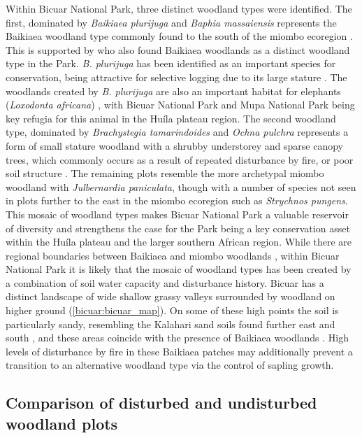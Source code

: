 \begin{refsection}
Within Bicuar National Park, three distinct woodland types were identified. The first, dominated by \textit{Baikiaea plurijuga} and \textit{Baphia massaiensis} represents the Baikiaea woodland type commonly found to the south of the miombo ecoregion \citep{Timberlake2010}. This is supported by \citet{Chisingui2018} who also found Baikiaea woodlands as a distinct woodland type in the Park. \textit{B. plurijuga} has been identified as an important species for conservation, being attractive for selective logging due to its large stature \citep{Ngandwe2017, Wallenfang2015}. The woodlands created by \textit{B. plurijuga} are also an important habitat for elephants (\textit{Loxodonta africana}) \citep{Sianga2017, Mukwashi2012}, with Bicuar National Park and Mupa National Park being key refugia for this animal in the Hu\'{i}la plateau region. The second woodland type, dominated by \textit{Brachystegia tamarindoides} and \textit{Ochna pulchra} represents a form of small stature woodland with a shrubby understorey and sparse canopy trees, which commonly occurs as a result of repeated disturbance by fire, or poor soil structure \citep{Smith2004}. The remaining plots resemble the more archetypal miombo woodland with \textit{Julbernardia paniculata}, though with a number of species not seen in plots further to the east in the miombo ecoregion such as \textit{Strychnos pungens}. This mosaic of woodland types makes Bicuar National Park a valuable reservoir of diversity and strengthens the case for the Park being a key conservation asset within the Hu\'{i}la plateau and the larger southern African region. While there are regional boundaries between Baikiaea and miombo woodlands \citep{White1983}, within Bicuar National Park it is likely that the mosaic of woodland types has been created by a combination of soil water capacity and disturbance history. Bicuar has a distinct landscape of wide shallow grassy valleys surrounded by woodland on higher ground (\autoref{bicuar:bicuar_map}). On some of these high points the soil is particularly sandy, resembling the Kalahari sand soils found further east and south \citep{Huntley2019}, and these areas coincide with the presence of Baikiaea woodlands \citep{Campbell2002}. High levels of disturbance by fire in these Baikiaea patches may additionally prevent a transition to an alternative woodland type via the control of sapling growth.

\subsection{Comparison of disturbed and undisturbed woodland plots}
\label{bicuar:ssec:disturbance_discussion}


\end{refsection}
